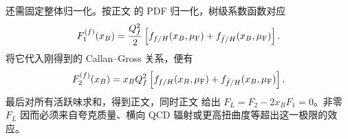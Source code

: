\begin{derivation}[深度非弹性散射的树级结构函数]
还需固定整体归一化。按正文 的 PDF 归一化，树级系数函数对应
\begin{equation*}
 F_1^{(f)}(x_B)=\frac{Q_f^2}{2}
 \left[f_{f/H}(x_B,\mu_{\rm F})+f_{\bar f/H}(x_B,\mu_{\rm F})\right].
\end{equation*}
将它代入刚得到的 Callan--Gross 关系，便有
\begin{equation*}
 F_2^{(f)}(x_B)
 =x_BQ_f^2
 \left[f_{f/H}(x_B,\mu_{\rm F})+f_{\bar f/H}(x_B,\mu_{\rm F})\right].
\end{equation*}
最后对所有活跃味求和，得到正文，同时正文 给出 $F_L=F_2-2x_BF_1=0$。非零 $F_L$ 因而必须来自夸克质量、横向 QCD 辐射或更高扭曲度等超出这一极限的效应。
\end{derivation}

